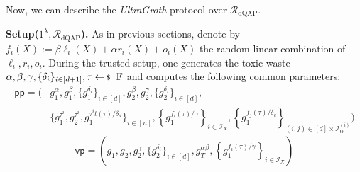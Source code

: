 Now, we can describe the \textit{UltraGroth} protocol over $\mathcal{R}_{\text{dQAP}}$.

\textbf{Setup($1^{\lambda},\mathcal{R}_{\text{dQAP}}$).} As in previous sections, denote by $f_i(X):= \beta \ell_i(X)+\alpha r_i(X)+o_i(X)$ the random linear combination of $\ell_i,r_i,o_i$. During the trusted setup, one generates the toxic waste $\alpha,\beta,\gamma,\{\delta_i\}_{i \in [d+1]},\tau \leftarrowS \mathbb{F}$ and computes the following common parameters:
\begin{align*}
\mathsf{pp} = \Big( &g_1^{\alpha},g_1^{\beta},\{g_1^{\delta_i}\}_{i \in [d]},g_2^{\beta}, g_2^{\gamma}, \{g_2^{\delta_i}\}_{i \in [d]}, \\
&\Big\{g_1^{\tau^i}, g_2^{\tau^i}, g_1^{\tau^it(\tau)/\delta_d}\Big\}_{i \in [n]}, \left\{g_1^{f_i(\tau)/\gamma}\right\}_{i \in \mathcal{I}_X}, \left\{g_1^{f_j(\tau)/\delta_i}\right\}_{(i,j) \in [d] \times \mathcal{I}_W^{(i)}}\Big)
\end{align*}
\[
\mathsf{vp} = \left( g_1,g_2, g_2^{\gamma}, \{g_2^{\delta_i}\}_{i \in [d]}, g_T^{\alpha\beta}, \left\{g_1^{f_i(\tau)/\gamma}\right\}_{i \in \mathcal{I}_{X}} \right)
\]

